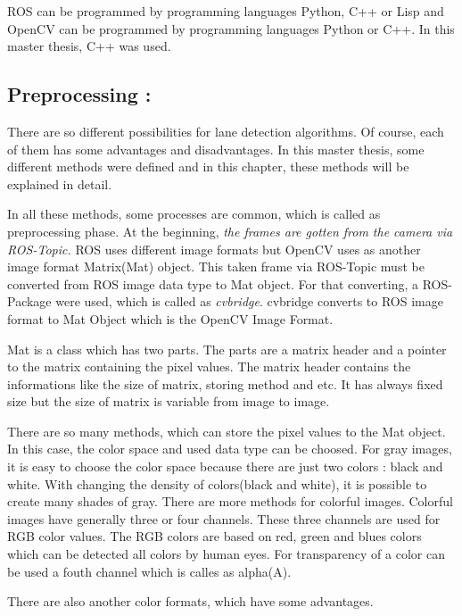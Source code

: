 ROS can be programmed by programming languages Python, C++ or Lisp and OpenCV can be programmed by programming languages Python or C++. In this master thesis, C++ was used.

%
\subsection{Preprocessing :}\label{sec:Preprocessing}

There are so different possibilities for lane detection algorithms. Of course, each of them has some advantages and disadvantages. In this master thesis, some different methods were defined and in this chapter, these methods will be explained in detail.

In all these methods, some processes are common, which is called as preprocessing phase. At the beginning,\emph{\color{blue} the frames are gotten from the camera via ROS-Topic.} ROS uses different image formats but OpenCV uses as another image format Matrix(Mat) object. This taken frame via ROS-Topic must be converted from ROS image data type to Mat object. For that converting, a ROS-Package were used, which is called as \textit{cvbridge}\cite{cv_bridge}. cvbridge converts to ROS image format to Mat Object which is the OpenCV Image Format. 

Mat is a class which has two parts. The parts are a matrix header and a pointer to the matrix containing the pixel values. The matrix header contains the informations like the size of matrix, storing method and etc. It has always fixed size but the size of matrix is variable from image to image.

There are so many methods, which can store the pixel values to the Mat object. In this case, the color space and used data type can be choosed. For gray images, it is easy to choose the color space because there are just two colors : black and white. With changing the density of colors(black and white), it is possible to create many shades of gray. There are more methods for colorful images. Colorful images have generally three or four channels. These three channels are used for RGB color values. The RGB colors are based on red, green and blues colors which can be detected all colors by human eyes. For transparency of a color can be used a fouth channel which is calles as alpha(A).

There are also another color formats, which have some advantages\cite{OpenCV_Mat}. 


